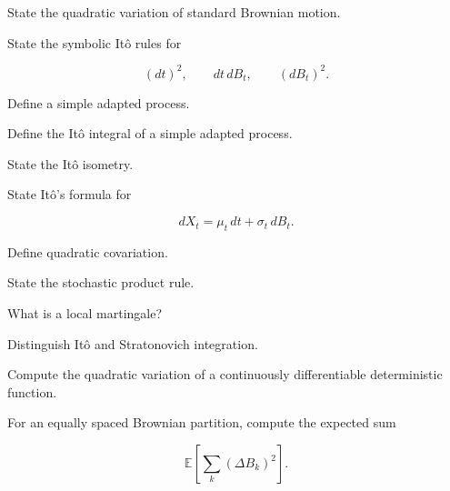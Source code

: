 \begin{exercise}[1]
State the quadratic variation of standard Brownian motion.
\end{exercise}

\begin{exercise}[1]
State the symbolic It\^o rules for

\[
(dt)^2,
\qquad
dt\,dB_t,
\qquad
(dB_t)^2.
\]
\end{exercise}

\begin{exercise}[1]
Define a simple adapted process.
\end{exercise}

\begin{exercise}[1]
Define the It\^o integral of a simple adapted process.
\end{exercise}

\begin{exercise}[1]
State the It\^o isometry.
\end{exercise}

\begin{exercise}[1]
State It\^o's formula for

\[
dX_t
=
\mu_t\,dt+\sigma_t\,dB_t.
\]
\end{exercise}

\begin{exercise}[1]
Define quadratic covariation.
\end{exercise}

\begin{exercise}[1]
State the stochastic product rule.
\end{exercise}

\begin{exercise}[1]
What is a local martingale?
\end{exercise}

\begin{exercise}[1]
Distinguish It\^o and Stratonovich integration.
\end{exercise}

\begin{exercise}[2]
Compute the quadratic variation of a continuously differentiable
deterministic function.
\end{exercise}

\begin{exercise}[2]
For an equally spaced Brownian partition, compute the expected sum

\[
\mathbb{E}
\left[
\sum_k
(\Delta B_k)^2
\right].
\]
\end{exercise}

